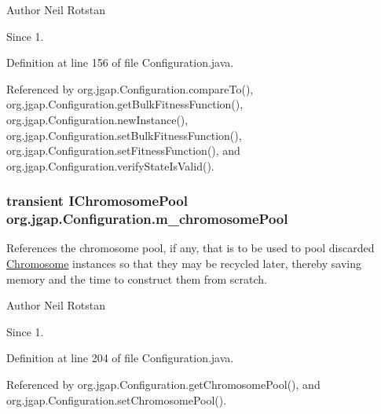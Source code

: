 \begin{DoxyAuthor}{Author}
Neil Rotstan 
\end{DoxyAuthor}
\begin{DoxySince}{Since}
1. 
\end{DoxySince}


Definition at line 156 of file Configuration.\-java.



Referenced by org.\-jgap.\-Configuration.\-compare\-To(), org.\-jgap.\-Configuration.\-get\-Bulk\-Fitness\-Function(), org.\-jgap.\-Configuration.\-new\-Instance(), org.\-jgap.\-Configuration.\-set\-Bulk\-Fitness\-Function(), org.\-jgap.\-Configuration.\-set\-Fitness\-Function(), and org.\-jgap.\-Configuration.\-verify\-State\-Is\-Valid().

\hypertarget{classorg_1_1jgap_1_1_configuration_a0d0f85cab0c95d8a6fe769811da7e818}{
\subsubsection[{m\-\_\-chromosome\-Pool}]{\setlength{\rightskip}{0pt plus 5cm}transient {\bf I\-Chromosome\-Pool} org.\-jgap.\-Configuration.\-m\-\_\-chromosome\-Pool\hspace{0.3cm}{\ttfamily [private]}}}\label{classorg_1_1jgap_1_1_configuration_a0d0f85cab0c95d8a6fe769811da7e818}
References the chromosome pool, if any, that is to be used to pool discarded \hyperlink{classorg_1_1jgap_1_1_chromosome}{Chromosome} instances so that they may be recycled later, thereby saving memory and the time to construct them from scratch.

\begin{DoxyAuthor}{Author}
Neil Rotstan 
\end{DoxyAuthor}
\begin{DoxySince}{Since}
1. 
\end{DoxySince}


Definition at line 204 of file Configuration.\-java.



Referenced by org.\-jgap.\-Configuration.\-get\-Chromosome\-Pool(), and org.\-jgap.\-Configuration.\-set\-Chromosome\-Pool().

